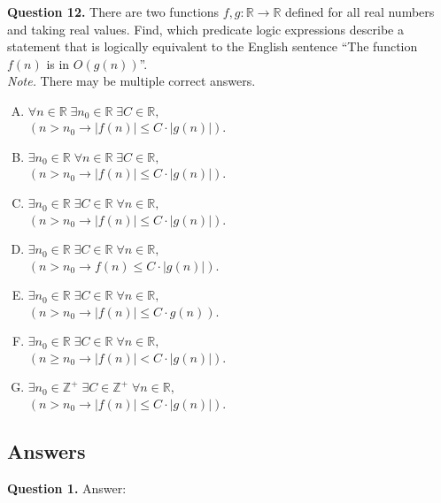 \documentclass[jou]{apa6}
\begin{document}
\vspace{6pt}
{\bf Question 12.} There are two functions $f,g: \mathbb{R} \rightarrow \mathbb{R}$ defined
for all real numbers and taking real values.
Find, which predicate logic expressions describe a statement that is logically
equivalent to the English sentence ``The function $f(n)$ is in $O(g(n))$''.\\
{\em Note.} There may be multiple correct answers. 

\begin{enumerate}[(A)]
\item $\forall n \in \mathbb{R}\;\exists n_0 \in \mathbb{R}\;\exists C \in \mathbb{R},$\\
$\left(n > n_0 \rightarrow |f(n)| \leq C\cdot{}|g(n)|\right)$. 
\item $\exists n_0 \in \mathbb{R}\;\forall n \in \mathbb{R}\;\exists C \in \mathbb{R},$\\
$(n > n_0 \rightarrow |f(n)| \leq C\cdot{}|g(n)|)$. 
\item $\exists n_0 \in \mathbb{R}\;\exists C \in \mathbb{R}\;\forall n \in \mathbb{R},$\\
$(n > n_0 \rightarrow |f(n)| \leq C\cdot{}|g(n)|)$. 
\item $\exists n_0 \in \mathbb{R}\;\exists C \in \mathbb{R}\;\forall n \in \mathbb{R},$\\
$(n > n_0 \rightarrow f(n) \leq C\cdot{}|g(n)|)$. 
\item $\exists n_0 \in \mathbb{R}\;\exists C \in \mathbb{R}\;\forall n \in \mathbb{R},$\\
$(n > n_0 \rightarrow |f(n)| \leq C\cdot{}g(n))$. 
\item $\exists n_0 \in \mathbb{R}\;\exists C \in \mathbb{R}\;\forall n \in \mathbb{R},$\\
$(n \geq n_0 \rightarrow |f(n)| < C\cdot{}|g(n)|)$. 
\item $\exists n_0 \in \mathbb{Z}^{+}\;\exists C \in \mathbb{Z}^{+}\;\forall n \in \mathbb{R},$\\
$(n > n_0 \rightarrow |f(n)| \leq C\cdot{}|g(n)|)$. 
\end{enumerate}

\newpage 
\subsection{Answers}

\vspace{6pt}
{\bf Question 1.} Answer:\\
\end{document}
